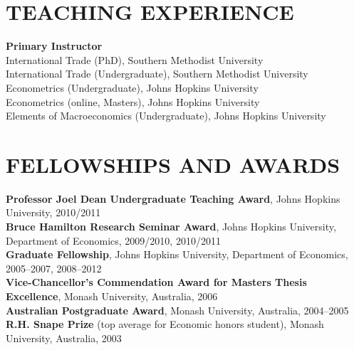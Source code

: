 \documentclass[11pt]{res}
\begin{document}
\begin{resume}
\section{TEACHING EXPERIENCE} \vspace{3mm}
{\bf Primary Instructor}\vspace{2mm}\\
International Trade (PhD), Southern Methodist University\vspace{1.5mm}\\
International Trade (Undergraduate), Southern Methodist University\vspace{1.5mm}\\
Econometrics (Undergraduate), Johns Hopkins University\vspace{1.5mm}\\
Econometrics (online, Masters), Johns Hopkins University\vspace{1.5mm}\\
Elements of Macroeconomics (Undergraduate), Johns Hopkins University\vspace{1.5mm}\\

\section{FELLOWSHIPS AND AWARDS}\vspace{2mm}
{\bf Professor Joel Dean Undergraduate Teaching Award}, Johns Hopkins University, 2010/2011\vspace{1.5mm}\\
{\bf Bruce Hamilton Research Seminar Award}, Johns Hopkins University, Department of Economics, 2009/2010, 2010/2011\vspace{1.5mm}\\
{\bf Graduate Fellowship}, Johns Hopkins University, Department of Economics, 2005--2007, 2008--2012\vspace{1.5mm}\\
{\bf Vice-Chancellor's Commendation Award for Masters Thesis Excellence}, Monash University, Australia, 2006\vspace{1.5mm}\\
{\bf Australian Postgraduate Award}, Monash University, Australia, 2004--2005\vspace{1.5mm}\\
{\bf R.H. Snape Prize} (top average for Economic honors student), Monash University, Australia, 2003 \\

\end{resume}
\end{document}
